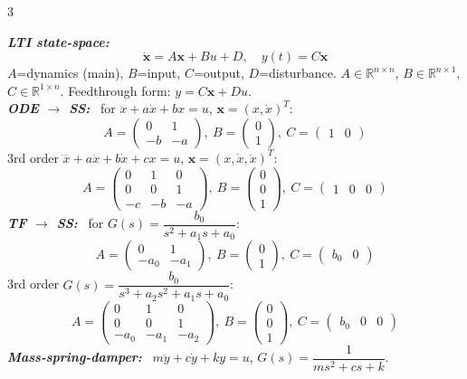 \documentclass[9pt]{extarticle}
\newcommand{\sect}[1]{%
  \vspace{2pt}\par\noindent
  \colorbox{hdrbg}{\makebox[\dimexpr\linewidth-2\fboxsep][l]{%
    \textbf{\footnotesize\textcolor{hdr}{#1}}}}%
  \par\vspace{1.5pt}}
\newcommand{\sub}[1]{\textit{\textbf{#1:}}\ }
\newcommand{\R}{\mathbb{R}}
\begin{document}
\small
\begin{multicols}{3}

\sect{1. Core Concepts \& Modelling}
\sub{LTI state-space}
\[ \dot{\mathbf{x}}=A\mathbf{x}+Bu+D,\quad y(t)=C\mathbf{x} \]
$A$=dynamics (main), $B$=input, $C$=output, $D$=disturbance. $A\!\in\!\R^{n\times n}$, $B\!\in\!\R^{n\times 1}$, $C\!\in\!\R^{1\times n}$. Feedthrough form: $y{=}C\mathbf{x}{+}Du$.\\[1pt]
\sub{ODE $\to$ SS} for $\ddot{x}+a\dot x+bx=u$, $\mathbf{x}=(x,\dot x)^T$:
\[ A=\begin{pmatrix}0&1\\-b&-a\end{pmatrix},\ B=\begin{pmatrix}0\\1\end{pmatrix},\ C=\begin{pmatrix}1&0\end{pmatrix} \]
3rd order $\dddot x+a\ddot x+b\dot x+cx=u$, $\mathbf{x}=(x,\dot x,\ddot x)^T$:
\[ A=\begin{pmatrix}0&1&0\\0&0&1\\-c&-b&-a\end{pmatrix},\ B=\begin{pmatrix}0\\0\\1\end{pmatrix},\ C=\begin{pmatrix}1&0&0\end{pmatrix} \]
\sub{TF $\to$ SS} for $G(s)=\dfrac{b_0}{s^2+a_1 s+a_0}$:
\[ A=\begin{pmatrix}0&1\\-a_0&-a_1\end{pmatrix},\ B=\begin{pmatrix}0\\1\end{pmatrix},\ C=\begin{pmatrix}b_0&0\end{pmatrix} \]
3rd order $G(s)=\dfrac{b_0}{s^3+a_2s^2+a_1s+a_0}$:
\[ A=\begin{pmatrix}0&1&0\\0&0&1\\-a_0&-a_1&-a_2\end{pmatrix},\ B=\begin{pmatrix}0\\0\\1\end{pmatrix},\ C=\begin{pmatrix}b_0&0&0\end{pmatrix} \]
\sub{Mass-spring-damper} $m\ddot y+c\dot y+ky=u$, $G(s)=\dfrac{1}{ms^2+cs+k}$.


\end{multicols}
\end{document}
